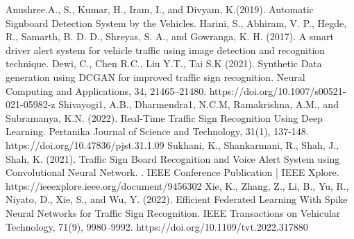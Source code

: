 \documentclass[conference]{IEEEtran}
\begin{document}
\begin{thebibliography}{00}
 Anushree.A., S., Kumar, H., Iram, I., and Divyam, K.(2019). Automatic Signboard Detection System by the Vehicles.
 Harini, S., Abhiram, V. P., Hegde, R., Samarth, B. D. D., Shreyas, S. A., and Gowranga, K. H. (2017). A smart driver alert system for vehicle traffic using image detection and recognition technique. 
 Dewi, C., Chen R.C., Liu Y.T., Tai S.K (2021). Synthetic Data generation using DCGAN for improved traffic sign recognition. Neural Computing and Applications, 34, 21465–21480. https://doi.org/10.1007/s00521-021-05982-z
 Shivayogi1, A.B., Dharmendra1, N.C.M, Ramakrishna, A.M., and Subramanya, K.N. (2022). Real-Time Traffic Sign Recognition Using Deep Learning. Pertanika Journal of Science and Technology, 31(1), 137-148. https://doi.org/10.47836/pjst.31.1.09
 Sukhani, K., Shankarmani, R., Shah, J., Shah, K. (2021). Traffic Sign Board Recognition and Voice Alert System using Convolutional Neural Network. . IEEE Conference Publication | IEEE Xplore. https://ieeexplore.ieee.org/document/9456302
 Xie, K., Zhang, Z., Li, B., Yu, R., Niyato, D., Xie, S., and Wu, Y. (2022). Efficient Federated Learning With Spike Neural Networks for Traffic Sign Recognition. IEEE Transactions on Vehicular Technology, 71(9), 9980–9992. https://doi.org/10.1109/tvt.2022.317880 
\end{thebibliography}
\vspace{12pt}
\end{document}
